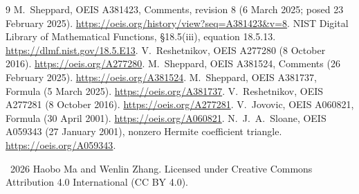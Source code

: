 \documentclass[11pt]{article}
\begin{document}
\begin{thebibliography}{9}
\small
{}
M.~Sheppard, OEIS A381423, Comments, revision 8 (6 March 2025;
posed 23 February 2025).
\url{https://oeis.org/history/view?seq=A381423&v=8}.
NIST Digital Library of Mathematical Functions, \S18.5(iii), equation 18.5.13.
\url{https://dlmf.nist.gov/18.5.E13}.
V.~Reshetnikov, OEIS A277280 (8 October 2016).
\url{https://oeis.org/A277280}.
M.~Sheppard, OEIS A381524, Comments (26 February 2025).
\url{https://oeis.org/A381524}.
M.~Sheppard, OEIS A381737, Formula (5 March 2025).
\url{https://oeis.org/A381737}.
V.~Reshetnikov, OEIS A277281 (8 October 2016).
\url{https://oeis.org/A277281}.
V.~Jovovic, OEIS A060821, Formula (30 April 2001).
\url{https://oeis.org/A060821}.
N.~J.~A.~Sloane, OEIS A059343 (27 January 2001),
nonzero Hermite coefficient triangle.
\url{https://oeis.org/A059343}.
\end{thebibliography}

\medskip\noindent
\textcopyright\ 2026 Haobo Ma and Wenlin Zhang.
Licensed under Creative Commons Attribution 4.0 International (CC BY 4.0).
\end{document}
